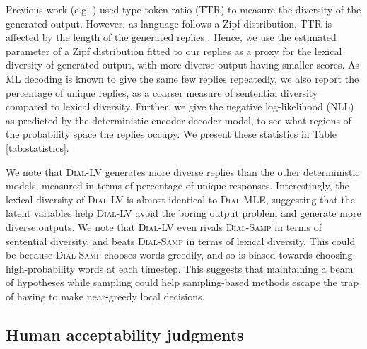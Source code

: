 Previous work (e.g. \citet{Jiwei:16}) used type-token ratio (TTR) to measure the diversity of the generated output. However, as language follows a Zipf distribution, TTR is affected by the length of the generated replies \citep{Mitchell:2015}. Hence, we use the estimated parameter of a Zipf distribution fitted to our replies as a proxy for the lexical diversity of generated output, with more diverse output having smaller scores. As ML decoding is known to give the same few replies repeatedly, we also report the percentage of unique replies, as a coarser measure of sentential diversity compared to lexical diversity. Further, we give the negative log-likelihood (NLL) as predicted by the deterministic encoder-decoder model, to see what regions of the probability space the replies occupy. We present these statistics in Table \ref{tab:statistics}. 

We note that \textsc{Dial-LV} generates more diverse replies than the other deterministic models, measured in terms of percentage of unique responses. Interestingly, the lexical diversity of \textsc{Dial-LV} is almost identical to \textsc{Dial-MLE}, suggesting that the latent variables help \textsc{Dial-LV} avoid the boring output problem and generate more diverse outputs. We note that \textsc{Dial-LV} even rivals \textsc{Dial-Samp} in terms of sentential diversity, and beats \textsc{Dial-Samp} in terms of lexical diversity. This could be because \textsc{Dial-Samp} chooses words greedily, and so is biased towards choosing high-probability words at each timestep. This suggests that maintaining a beam of hypotheses while sampling could help sampling-based methods escape the trap of having to make near-greedy local decisions.


\subsection{Human acceptability judgments}

\begin{table}[t]
\caption{Mean and std. dev. of average number of acceptable replies generated by each model.}
\label{tab:acceptability}
\end{table}

